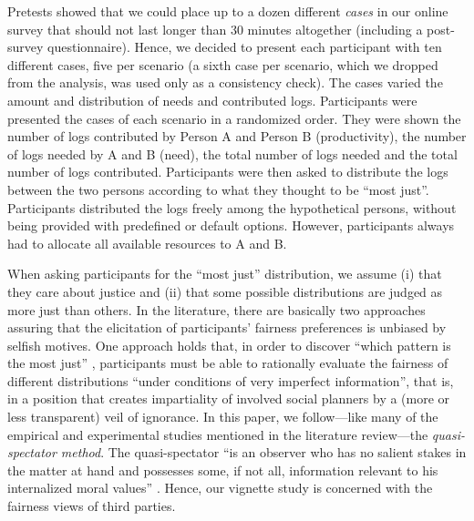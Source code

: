 \documentclass[smallcondensed]{svjour3}
\begin{document}
Pretests showed that we could place up to a dozen different \textit{cases} in our online survey that should not last longer than 30 minutes altogether (including a post-survey questionnaire). Hence, we decided to present each participant with ten different cases, five per scenario (a sixth case per scenario, which we dropped from the analysis, was used only as a consistency check). The cases varied the amount and distribution of needs and contributed logs. Participants were presented the cases of each scenario in a randomized order. They were shown the number of logs contributed by Person A and Person B (productivity), the number of logs needed by A and B (need), the total number of logs needed and the total number of logs contributed. Participants were then asked to distribute the logs between the two persons according to what they thought to be ``most just''. Participants distributed the logs freely among the hypothetical persons, without being provided with predefined or default options. However, participants always had to allocate all available resources to A and B.\par
%
When asking participants for the ``most just'' distribution, we assume (i) that they care about justice and (ii) that some possible distributions are judged as more just than others. In the literature, there are basically two approaches assuring that the elicitation of participants' fairness preferences is unbiased by selfish motives. One approach holds that, in order to discover ``which pattern is the most just'' \citep[p. 2]{frohlich_laboratory_1987}, participants must be able to rationally evaluate the fairness of different distributions ``under conditions of very imperfect information'', that is, in a position that creates impartiality of involved social planners by a (more or less transparent) veil of ignorance. In this paper, we follow---like many of the empirical and experimental studies mentioned in the literature review---the \textit{quasi-spectator method}. The quasi-spectator ``is an observer who has no salient stakes in the matter at hand and possesses some, if not all, information relevant to his internalized moral values'' \citep[p. 106]{konow_is_2009}. Hence, our vignette study is concerned with the fairness views of third parties.\par
%
\end{document}
